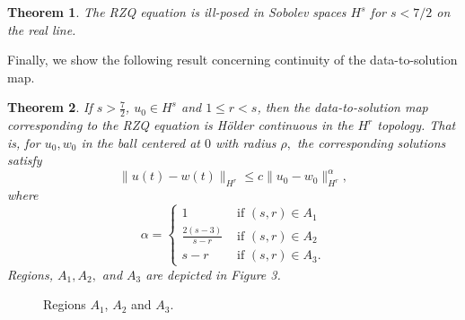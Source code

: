 \documentclass[reqno]{amsart}
\theoremstyle{plain}
\newtheorem{theorem}{Theorem}[section]
\numberwithin{equation}{section}
\begin{document}
\begin{theorem}\label{illp}
The RZQ equation is ill-posed in Sobolev spaces $H^s$ for $s<7/2$ on the real line.
\end{theorem} 


Finally, we show the following result concerning continuity of the data-to-solution map.

\begin{theorem}
    If $s > \frac72$, $u_0 \in H^s$ and $1 \le r < s$, then the data-to-solution map corresponding to the RZQ equation  is H\"older continuous in the $H^r$ topology.
That is, for $u_0, w_0$ in the ball centered at $0$ with radius $\rho,$ the corresponding solutions satisfy 
\begin{equation}\label{holder}
    \|u(t) - w(t)\|_{H^r} \leq c\|u_0-w_0\|_{H^r}^{\alpha}, 
\end{equation}
where
\begin{equation}
    \alpha = 
\begin{cases}
    1 & \text{ if $(s,r) \in A_1$} \\
    \frac{2(s-3)}{s-r} & \text{ if $(s,r) \in A_2$} \\
    s-r & \text{ if $(s,r) \in A_3$}. 
\end{cases}
\end{equation}
Regions, $A_1, A_2,$ and $A_3$ are depicted in Figure 3.
\end{theorem}
 \begin{figure} 
 \label{figure3}
\caption{Regions $A_1$, $A_2$ and $A_3$.}
\end{figure}
\end{document}
